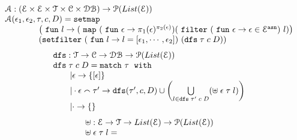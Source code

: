 \begin{defn}
\[
\begin{array}{l}
	\mathcal{A}:(\eventset \times \eventset \times \mathcal{T} \times \cdom \times \dbdom )\to \mathcal{P}(List(\eventset))
	\\
	\mathcal{A}(\event_1, \event_2, \trace, c, D) 
	= 
	\kw{setmap} ~
	\\ \qquad \qquad
	\left(\efun l \to ( \emap 
		(\efun  \event \to \pi_1(\event)^{\pi_2(\event)})
	(\efilter 
		(\efun \event \to  \event \in \eventset^{\asn}) ~ l) \right)
	\\ \qquad \qquad
	(\kw{setfilter} ~
		(\efun l \to l = [\event_1, \cdots, \event_2]) ~ (\kw{dfs} \eapp \trace \eapp c \eapp  D ))
	\end{array}
\]
%
%
\[
\begin{array}{l}
	\kw{dfs} : \mathcal{T} \to \cdom \to \dbdom \to \mathcal{P}(List(\eventset))
	\\
	\kw{dfs} \eapp \trace \eapp c \eapp  D
	= 
	\ematch~  \trace ~ \ewith
	\\ \qquad
	| \event \to \{[\event]\}
	\\ \qquad
	|  \cdot \event \tracecat \trace' \to  
	\kw{dfs}(\trace', c, D)
	\cup 
	\left(   \bigcup\limits_{l \in \kw{dfs} \eapp \trace' \eapp c \eapp  D }
	\left( \uplus \eapp  \event  \eapp \trace  \eapp l \right)
	\right)
	\\ \qquad
	| \cdot \to \{\}
\end{array}
\]
%
%
\[
\begin{array}{l}
	\uplus : \mathcal{E} \to \mathcal{T} \to List(\mathcal{E}) \to \mathcal{P}(List(\mathcal{E}))
	\\
	\uplus \;  \mathtt{\epsilon}  \; \mathtt{\tau}  \; l
	= 

\end{array}\]
\end{defn}
